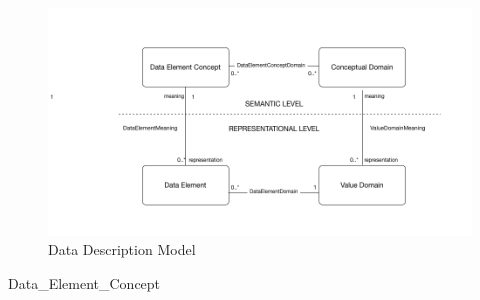\documentclass{llncs}
\begin{document}
\begin{figure}[h]
\includegraphics[width=1.0\textwidth,natwidth=610,natheight=642]{DataDescModel}
\caption{Data Description Model} 
\label{fig:ddmodel}
\end{figure}

\begin{class}{Data\_Element\_Concept}


 \end{class}
 


\newpage




\end{document}
